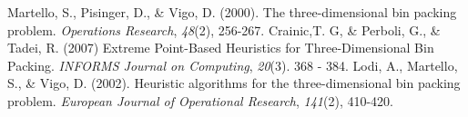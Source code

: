 \documentclass[a4paper, 11pt]{article}
\begin{document}
\begin{thebibliography}{9}
 Martello, S., Pisinger, D., \& Vigo, D. (2000). The three-dimensional bin packing problem. \emph{Operations Research}, \emph{48}(2), 256-267.
 Crainic,T. G, \& Perboli, G., \& Tadei, R. (2007) Extreme Point-Based Heuristics for Three-Dimensional Bin Packing. \emph{INFORMS Journal on Computing}, \emph{20}(3). 368 - 384.
 Lodi, A., Martello, S., \& Vigo, D. (2002). Heuristic algorithms for the three-dimensional bin packing problem. \emph{European Journal of Operational Research}, \emph{141}(2), 410-420.
\end{thebibliography}
\end{document}
